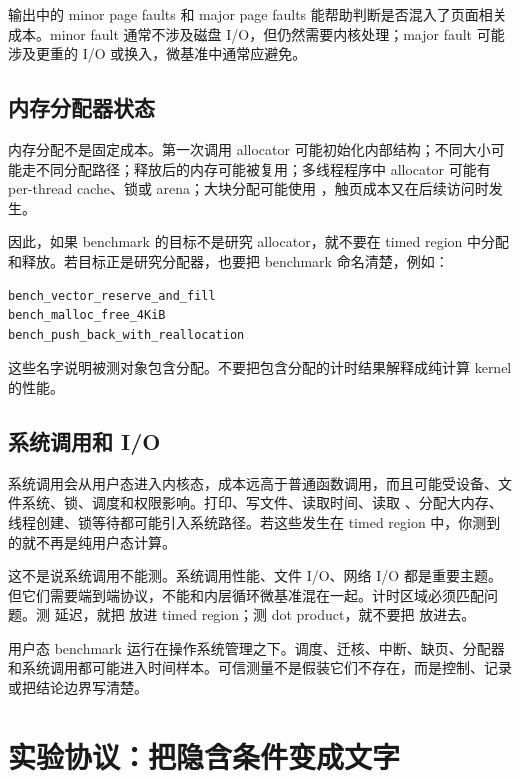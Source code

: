输出中的 minor page faults 和 major page faults 能帮助判断是否混入了页面相关成本。minor fault 通常不涉及磁盘 I/O，但仍然需要内核处理；major fault 可能涉及更重的 I/O 或换入，微基准中通常应避免。

\subsection{内存分配器状态}

内存分配不是固定成本。第一次调用 allocator 可能初始化内部结构；不同大小可能走不同分配路径；释放后的内存可能被复用；多线程程序中 allocator 可能有 per-thread cache、锁或 arena；大块分配可能使用 ，触页成本又在后续访问时发生。

因此，如果 benchmark 的目标不是研究 allocator，就不要在 timed region 中分配和释放。若目标正是研究分配器，也要把 benchmark 命名清楚，例如：

\begin{lstlisting}
bench_vector_reserve_and_fill
bench_malloc_free_4KiB
bench_push_back_with_reallocation
\end{lstlisting}

这些名字说明被测对象包含分配。不要把包含分配的计时结果解释成纯计算 kernel 的性能。

\subsection{系统调用和 I/O}

系统调用会从用户态进入内核态，成本远高于普通函数调用，而且可能受设备、文件系统、锁、调度和权限影响。打印、写文件、读取时间、读取 、分配大内存、线程创建、锁等待都可能引入系统路径。若这些发生在 timed region 中，你测到的就不再是纯用户态计算。

这不是说系统调用不能测。系统调用性能、文件 I/O、网络 I/O 都是重要主题。但它们需要端到端协议，不能和内层循环微基准混在一起。计时区域必须匹配问题。测  延迟，就把  放进 timed region；测 dot product，就不要把  放进去。

\begin{keyidea}
用户态 benchmark 运行在操作系统管理之下。调度、迁核、中断、缺页、分配器和系统调用都可能进入时间样本。可信测量不是假装它们不存在，而是控制、记录或把结论边界写清楚。
\end{keyidea}

\section{实验协议：把隐含条件变成文字}

